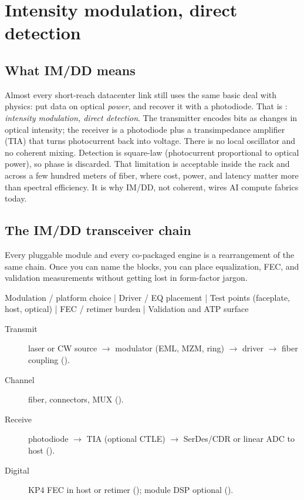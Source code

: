 \chapter{Intensity modulation, direct detection}
\label{ch:imdd}

\section{What IM/DD means}

Almost every short-reach datacenter link still uses the same basic deal with
physics: put data on optical \emph{power}, and recover it with a photodiode.
That is : \emph{intensity modulation, direct detection}. The
transmitter encodes bits as changes in optical intensity; the receiver is a
photodiode plus a transimpedance amplifier (TIA) that turns photocurrent back
into voltage. There is no local oscillator and no coherent mixing. Detection is
square-law (photocurrent proportional to optical power), so phase is discarded.
That limitation is acceptable inside the rack and across a few hundred meters of
fiber, where cost, power, and latency matter more than spectral efficiency. It is
why IM/DD, not coherent, wires AI compute fabrics today.

\section{The IM/DD transceiver chain}
\label{sec:txrx-chain}

Every pluggable module and every co-packaged engine is a rearrangement of the same
chain. Once you can name the blocks, you can place equalization, FEC, and
validation measurements without getting lost in form-factor jargon.

\begin{dectree}
Modulation / platform choice
  |
Driver / EQ placement
  |
Test points (faceplate, host, optical)
  |
FEC / retimer burden
  |
Validation and ATP surface
\end{dectree}

\begin{description}
\item[Transmit] laser or CW source $\to$ modulator (EML, MZM, ring)
      $\to$ driver $\to$ fiber coupling ().
\item[Channel] fiber, connectors, MUX ().
\item[Receive] photodiode $\to$ TIA (optional CTLE) $\to$ SerDes/CDR or linear ADC to
      host ().
\item[Digital] KP4 FEC in host or retimer (); module DSP optional
      ().
\end{description}

